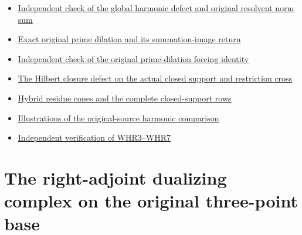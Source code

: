 \begin{itemize}
{  harmonic sweeping, the full off-critical distribution, and an exact
  summation-image test}
\item
  \href{https://github.com/KokunoYumeto/zeta-function-research-reader/blob/main/workbenches/splitzero-tandem/continuations/20260925-full-source-tensor-and-original-divisor/counterfactual/HSW_INDEPENDENT_CHECK.md}{Independent
  check of the global harmonic defect and original resolvent norm sum}
\item
  \href{https://github.com/KokunoYumeto/zeta-function-research-reader/blob/main/workbenches/splitzero-tandem/continuations/20260925-full-source-tensor-and-original-divisor/counterfactual/ORIGINAL_PRIME_DILATION_FORCING_IDENTITY.md}{Exact
  original prime dilation and its summation-image return}
\item
  \href{https://github.com/KokunoYumeto/zeta-function-research-reader/blob/main/workbenches/splitzero-tandem/continuations/20260925-full-source-tensor-and-original-divisor/counterfactual/ORIGINAL_PRIME_DILATION_FORCING_INDEPENDENT_CHECK.md}{Independent
  check of the original prime-dilation forcing identity}
\item
  \href{https://github.com/KokunoYumeto/zeta-function-research-reader/blob/main/workbenches/splitzero-tandem/continuations/20260925-full-source-tensor-and-original-divisor/counterfactual/HILBERT_CLOSURE_CLOSED_SUPPORT_AND_RESTRICTION.md}{The
  Hilbert closure defect on the actual closed support and restriction
  cross}
\item
  \href{https://github.com/KokunoYumeto/zeta-function-research-reader/blob/main/workbenches/splitzero-tandem/continuations/20260925-full-source-tensor-and-original-divisor/counterfactual/HILBERT_CLOSURE_SUPPORT_INDEPENDENT_CHECK.md}{Hybrid
  residue cones and the complete closed-support rows}
\item
  \href{https://github.com/KokunoYumeto/zeta-function-research-reader/blob/main/workbenches/splitzero-tandem/continuations/20260925-full-source-tensor-and-original-divisor/counterfactual/HARMONIC_SOURCE_RETURN_ILLUSTRATIONS.md}{Illustrations
  of the original-source harmonic comparison}
\item
  \href{https://github.com/KokunoYumeto/zeta-function-research-reader/blob/main/workbenches/splitzero-tandem/continuations/20260925-full-source-tensor-and-original-divisor/counterfactual/WHR3_7_INDEPENDENT_VERIFICATION_20260925.md}{Independent
  verification of WHR3--WHR7}
\end{itemize}

\chapter{The right-adjoint dualizing complex on the original three-point
base}\label{the-right-adjoint-dualizing-complex-on-the-original-three-point-base}


